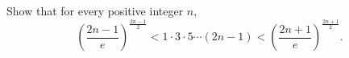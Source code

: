 Show that for every positive integer $n$,
\[
\left( \frac{2n-1}{e} \right)^{\frac{2n-1}{2}} < 1 \cdot 3 \cdot 5
\cdots (2n-1) < \left( \frac{2n+1}{e} \right)^{\frac{2n+1}{2}}.
\]
